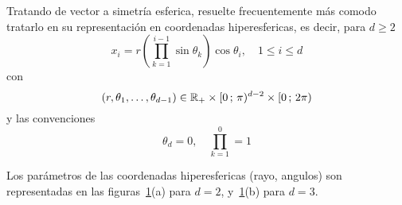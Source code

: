 Tratando de  vector a simetr\'ia  esferica, resuelte frecuentemente  m\'as comodo
tratarlo en su representaci\'on en coordenadas hiperesfericas, es decir, para $d
\ge 2$
%
\[
x_i = r \left( \prod_{k=1}^{i-1} \sin\theta_k \right) \cos \theta_i, \quad 1 \le
i \le d
\]
%
con
%
\[
(r,\theta_1,\ldots,\theta_{d-1}) \in \mathbb{R}_+ \times [0 \, ; \, \pi)^{d-2} \times [0 \, ; \, 2 \pi)
\]
%
y las convenciones
%
\[
\theta_d = 0, \quad \prod_{k=1}^{0} = 1
\]

Los  par\'ametros   de  las  coordenadas  hiperesfericas   (rayo,  angulos)  son
representadas en las figuras~\ref{Fig:MP:CoordenadasHiperesfericas}(a) para $d =
2$, y~\ref{Fig:MP:CoordenadasHiperesfericas}(b) para $d = 3$.

\begin{figure}[h!]
\begin{center}  \end{center}
% 
%
\label{Fig:MP:CoordenadasHiperesfericas}
\end{figure}

